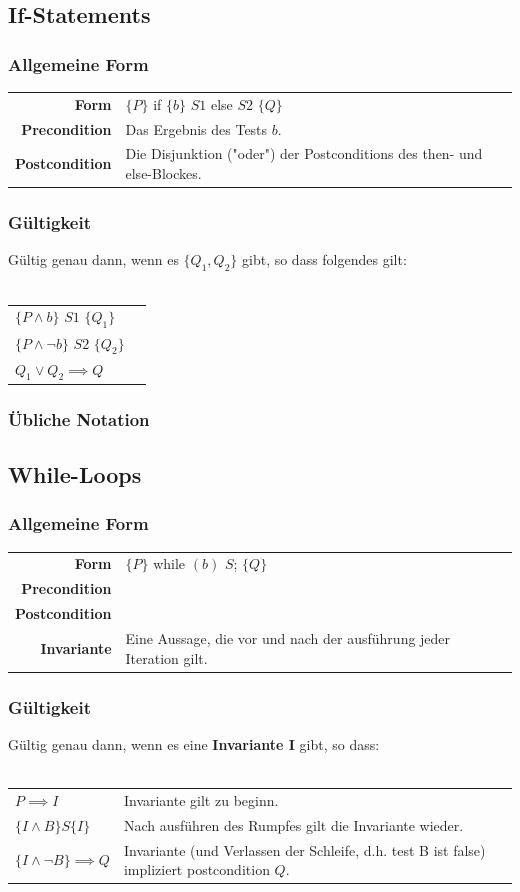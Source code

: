 \documentclass[12pt,a4paper]{article}
\begin{document}
\subsection{If-Statements}
\subsubsection{Allgemeine Form}
\begin{tabularx}{\linewidth}{r X}
\textbf{Form} & $\{P\}$ if $\{b\}$ $S1$ else $S2$ $\{Q\}$\\
\textbf{Precondition} & Das Ergebnis des Tests $b$.\\
\textbf{Postcondition} & Die Disjunktion ("oder") der Postconditions des then- und else-Blockes.
\end{tabularx}
\subsubsection{Gültigkeit}
Gültig genau dann, wenn es $\{Q_1, Q_2\}$ gibt, so dass folgendes gilt:\\\\
\begin{tabular}{ll}
$\{P \land b\}$ $S1$ $\{Q_1\}$\\
$\{P \land \neg b \}$ $S2$ $\{Q_2\}$\\
$Q_1 \lor Q_2 \implies Q$
\end{tabular}
\subsubsection{Übliche Notation}

\subsection{While-Loops}
\subsubsection{Allgemeine Form}
\begin{tabularx}{\linewidth}{r X}
\textbf{Form} & $\{P\}$ while $(b)$ $S$; $\{Q\}$\\ %
\textbf{Precondition} & \\
\textbf{Postcondition} & \\
\textbf{Invariante} & Eine Aussage, die vor und nach der ausführung jeder Iteration gilt.
\end{tabularx}
\subsubsection{Gültigkeit}
Gültig genau dann, wenn es eine \textbf{Invariante I} gibt, so dass:\\\\
\begin{tabularx}{\linewidth}{lX}
$P \implies I$ & Invariante gilt zu beginn.\\
$\{I \land B\} S \{I\}$ & Nach ausführen des Rumpfes gilt die Invariante wieder.\\
$\{I \land \neg B\} \implies Q$ & Invariante (und Verlassen der Schleife, d.h. test B ist false) impliziert postcondition $Q$.
\end{tabularx}
\end{document}
